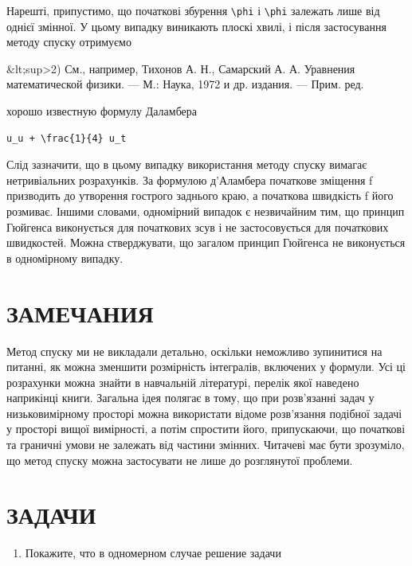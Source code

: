 \documentclass[
  ukrainian,
]{article}
\providecommand{\tightlist}{%
  \setlength{\itemsep}{0pt}\setlength{\parskip}{0pt}}
\begin{document}
Нарешті, припустимо, що початкові збурення \texttt{\textbackslash{}phi}
і \texttt{\textbackslash{}phi} залежать лише від однієї змінної. У цьому
випадку виникають плоскі хвилі, і після застосування методу спуску
отримуємо

\&lt;sup\textgreater2) См., например, Тихонов А. Н., Самарский А. А.
Уравнения математической физики. --- М.: Наука, 1972 и др. издания. ---
Прим. ред.

хорошо известную формулу Даламбера

\begin{verbatim}
u_u + \frac{1}{4} u_t
\end{verbatim}

Слід зазначити, що в цьому випадку використання методу спуску вимагає
нетривіальних розрахунків. За формулою д'Аламбера початкове зміщення f
призводить до утворення гострого заднього краю, а початкова швидкість f
його розмиває. Іншими словами, одномірний випадок є незвичайним тим, що
принцип Гюйгенса виконується для початкових зсув і не застосовується для
початкових швидкостей. Можна стверджувати, що загалом принцип Гюйгенса
не виконується в одномірному випадку.

\section{ЗАМЕЧАНИЯ}\label{ux437ux430ux43cux435ux447ux430ux43dux438ux44f-1}

Метод спуску ми не викладали детально, оскільки неможливо зупинитися на
питанні, як можна зменшити розмірність інтегралів, включених у формули.
Усі ці розрахунки можна знайти в навчальній літературі, перелік якої
наведено наприкінці книги. Загальна ідея полягає в тому, що при
розв'язанні задач у низьковимірному просторі можна використати відоме
розв'язання подібної задачі у просторі вищої вимірності, а потім
спростити його, припускаючи, що початкові та граничні умови не залежать
від частини змінних. Читачеві має бути зрозуміло, що метод спуску можна
застосувати не лише до розглянутої проблеми.

\section{ЗАДАЧИ}\label{ux437ux430ux434ux430ux447ux438-2}

\begin{enumerate}
\def\labelenumi{\arabic{enumi}.}
\tightlist
\item
  Покажите, что в одномерном случае решение задачи
\end{enumerate}
\end{document}
